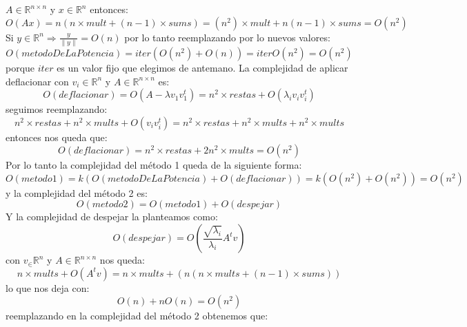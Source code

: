 $A\in\mathbb{R}^{n \times n}$ y $x\in\mathbb{R}^n$ entonces:
\begin{displaymath}
  O(Ax) = n(n \times mult + (n-1) \times sums) = (n^2)\times mult + n(n-1)\times sums = O(n^2)
\end{displaymath}
Si $y\in\mathbb{R}^n \Rightarrow \frac{y}{\parallel y \parallel} = O(n)$ por lo tanto reemplazando por lo nuevos valores: 
\begin{displaymath}
  O(metodoDeLaPotencia) = iter(O(n^2) + O(n)) = iterO(n^2) = O(n^2)
\end{displaymath}
porque $iter$ es un valor fijo que elegimos de antemano. La complejidad de aplicar deflacionar con
$v_i\in\mathbb{R}^n$ y $A\in\mathbb{R}^{n \times n}$ es:
\begin{displaymath}
  O(deflacionar) = O(A-\lambda{v_1}v_1^t) = n^2 \times restas + O(\lambda_i{v_i}v_i^t) 
\end{displaymath}
seguimos reemplazando:
\begin{displaymath}
n^2 \times restas + n^2 \times mults + O(v_i{v_i^t}) = n^2 \times restas + n^2 \times mults + n^2 \times mults
\end{displaymath}
entonces nos queda que:
\begin{displaymath}
 O(deflacionar) = n^2 \times restas + 2n^2 \times mults = O(n^2) 
\end{displaymath}
Por lo tanto la complejidad del método 1 queda de la siguiente forma:
\begin{displaymath}
O(metodo1) = k (O(metodoDeLaPotencia) + O(deflacionar)) = k(O(n^2) + O(n^2)) = O(n^2) 
\end{displaymath}
y la complejidad del método 2 es:
\begin{displaymath}
O(metodo2) = O(metodo1) + O(despejar)
\end{displaymath}
Y la complejidad de despejar la planteamos como:
\begin{displaymath}
O(despejar) = O(\frac{ \sqrt{\lambda_{i} } }{ \lambda_{i} }  A^{t}v)
\end{displaymath}
con $v_\in\mathbb{R}^n$ y $A\in\mathbb{R}^{n \times n}$ nos queda:
\begin{displaymath}
 n \times mults + O(A^{t}v) = n \times mults + (n(n \times mults + (n-1) \times sums))  
\end{displaymath}
lo que nos deja con:
\begin{displaymath}
 O(n) + nO(n) = O(n^2)
\end{displaymath}
reemplazando en la complejidad del método 2 obtenemos que:
